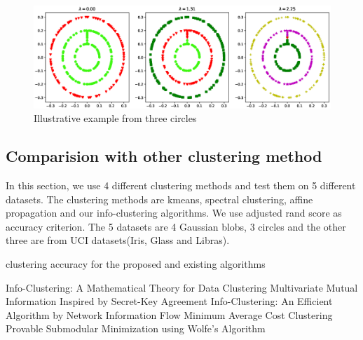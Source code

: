 \documentclass{article}
\theoremstyle{definition}
\begin{document}
\begin{figure}[!ht]
\includegraphics[width=12cm]{pic/3circle.eps}
\caption{Illustrative example from three circles}\label{fig:3c}
\end{figure}
\subsection{Comparision with other clustering method}
In this section, we use 4 different clustering methods and test them on 5 different datasets. The clustering methods are kmeans, spectral clustering, affine propagation and our info-clustering algorithms. We use adjusted rand score as accuracy criterion. The 5 datasets are 4 Gaussian blobs, 3 circles and the other three are from UCI datasets(Iris, Glass and Libras).
\begin{table}[!ht]
\centering
{}
\caption{clustering accuracy for the proposed and existing algorithms}
\end{table}
\begin{thebibliography}{9}
Info-Clustering: A Mathematical Theory for Data Clustering
 Multivariate Mutual Information Inspired by Secret-Key Agreement
 Info-Clustering: An Efficient Algorithm by Network Information Flow
 Minimum Average Cost Clustering
 Provable Submodular Minimization using Wolfe's Algorithm
\end{thebibliography}
\end{document}
